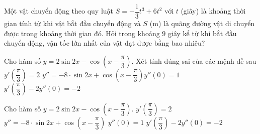 \begin{bt}%
	Một vật chuyển động theo quy luật $S=-\dfrac{1}{3}t^3+6t^2$ với $t$ (giây) là khoảng thời gian tính từ khi vật bắt đầu chuyển động và $S$ (m) là quãng đường vật di chuyển được trong khoảng thời gian đó. Hỏi trong khoảng $9$ giây kể từ khi bắt đầu chuyển động, vận tốc lớn nhất của vật đạt được bằng bao nhiêu?
\end{bt}

\begin{ex}%
 Cho hàm số $y=2\sin 2x-\cos\left(x-\dfrac{\pi}{3}\right)$. Xét tính đúng sai  của các mệnh đề sau
  \choiceTF
   {$y'\left(\dfrac{\pi}{3} \right)=2$}
  {\True $y''=-8\cdot\sin 2x+\cos\left(x-\dfrac{\pi}{3}\right)$}{$y''(0)=1$} 
  {$y'\left(\dfrac{\pi}{3}\right)-2y''(0)=-2$} 
\end{ex}

\begin{ex}%
	 Cho hàm số $y=2\sin 2x-\cos\left(x-\dfrac{\pi}{3}\right)$.
	\choiceTF 
		{$y'\left(\dfrac{\pi}{3}\right)=2$} 
		 {\True $y''=-8\cdot\sin 2x+\cos\left(x-\dfrac{\pi}{3}\right)$}
		{$y''(0)=1$} 
		{$y'\left(\dfrac{\pi}{3}\right)-2y''(0)=-2$} 
\end{ex}

